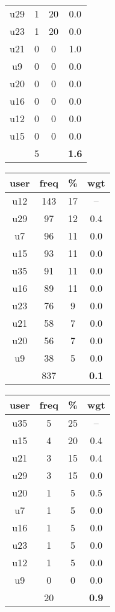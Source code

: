 \begin{appendices}
\begin{table}
\begin{tabular}{ |c|c|c|c| }
	u29 & 1 & 20 & 0.0 \\
	u23 & 1 & 20 & 0.0 \\
	u21 & 0 & 0 & 1.0 \\
	u9 & 0 & 0 & 0.0 \\
	u20 & 0 & 0 & 0.0 \\
	u16 & 0 & 0 & 0.0 \\
	u12 & 0 & 0 & 0.0 \\
	u15 & 0 & 0 & 0.0 \\
	 & 5 & & \textbf{1.6} \\
	\hline
\end{tabular}
\begin{tabular}{ |c|c|c|c| }
	\hline
	\textbf{user} & \textbf{freq} & \textbf{\%} & \textbf{wgt} \\
	\hline
	u12 & 143 & 17 & -- \\
	u29 & 97 & 12 & 0.4 \\
	u7 & 96 & 11 & 0.0 \\
	u15 & 93 & 11 & 0.0 \\
	u35 & 91 & 11 & 0.0 \\
	u16 & 89 & 11 & 0.0 \\
	u23 & 76 & 9 & 0.0 \\
	u21 & 58 & 7 & 0.0 \\
	u20 & 56 & 7 & 0.0 \\
	u9 & 38 & 5 & 0.0 \\
	 & 837 & & \textbf{0.1} \\
	\hline
\end{tabular}
\begin{tabular}{ |c|c|c|c| }
	\hline
	\textbf{user} & \textbf{freq} & \textbf{\%} & \textbf{wgt} \\
	\hline
	u35 & 5 & 25 & -- \\
	u15 & 4 & 20 & 0.4 \\
	u21 & 3 & 15 & 0.4 \\
	u29 & 3 & 15 & 0.0 \\
	u20 & 1 & 5 & 0.5 \\
	u7 & 1 & 5 & 0.0 \\
	u16 & 1 & 5 & 0.0 \\
	u23 & 1 & 5 & 0.0 \\
	u12 & 1 & 5 & 0.0 \\
	u9 & 0 & 0 & 0.0 \\
	 & 20 & & \textbf{0.9} \\
	\hline
\end{tabular}

\end{table}
\end{appendices}
